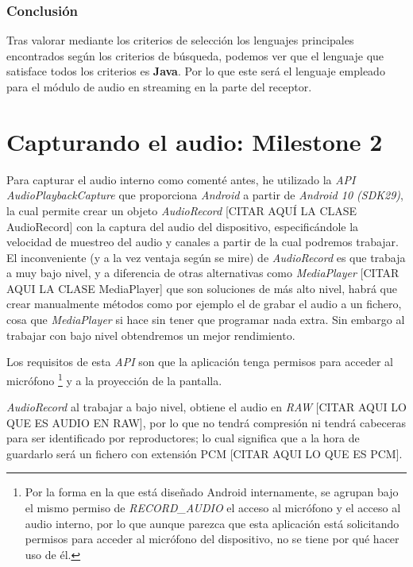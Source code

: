 \subsubsection{Conclusión}

Tras valorar mediante los criterios de selección los lenguajes principales
encontrados según los criterios de búsqueda, podemos ver que el lenguaje que
satisface todos los criterios es \textbf{Java}. Por lo que este será el lenguaje
empleado para el módulo de audio en streaming en la parte del receptor.


\section{Capturando el audio: Milestone 2}

Para capturar el audio interno como comenté antes, he utilizado la \emph{API
AudioPlaybackCapture} que proporciona \emph{Android} a partir de \emph{Android
10 (SDK29)}, la cual permite crear un objeto \emph{AudioRecord} [CITAR AQUÍ LA
CLASE AudioRecord] con la captura del audio del dispositivo, especificándole la
velocidad de muestreo del audio y canales a partir de la cual podremos trabajar.
El inconveniente (y a la vez ventaja según se mire) de \emph{AudioRecord} es que
trabaja a muy bajo nivel, y a diferencia de otras alternativas como
\emph{MediaPlayer} [CITAR AQUI LA CLASE MediaPlayer] que son soluciones de más
alto nivel, habrá que crear manualmente métodos como por ejemplo el de grabar el
audio a un fichero, cosa que \emph{MediaPlayer} si hace sin tener que programar
nada extra. Sin embargo al trabajar con bajo nivel obtendremos un mejor
rendimiento. 

Los requisitos de esta \emph{API} son que la
aplicación tenga permisos para acceder al micrófono \footnote{Por la forma en la
que está diseñado Android internamente, se agrupan bajo el mismo permiso de
\emph{RECORD\_AUDIO} el acceso al micrófono y el acceso al audio interno, por lo
que aunque parezca que esta aplicación está solicitando permisos para acceder al
micrófono del dispositivo, no se tiene por qué hacer uso de él.} y a la
proyección de la pantalla.

\newpage

\emph{AudioRecord} al trabajar a bajo nivel, obtiene el audio en \emph{RAW}
[CITAR AQUI LO QUE ES AUDIO EN RAW], por lo que no tendrá compresión ni tendrá
cabeceras para ser identificado por reproductores; lo cual significa que a la
hora de guardarlo será un fichero con extensión PCM [CITAR AQUI LO QUE ES PCM].

